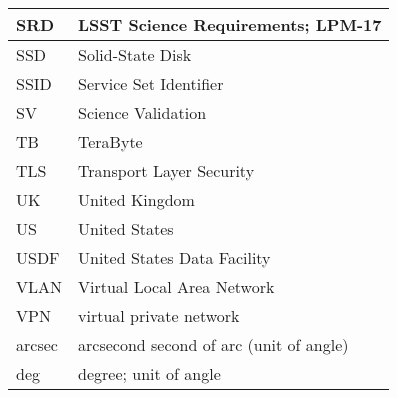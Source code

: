 \begin{longtable}{p{}p{}}
SRD & LSST Science Requirements; LPM-17 \\\hline
SSD & Solid-State Disk \\\hline
SSID & Service Set Identifier \\\hline
SV & Science Validation \\\hline
TB & TeraByte \\\hline
TLS & Transport Layer Security \\\hline
UK & United Kingdom \\\hline
US & United States \\\hline
USDF & United States Data Facility \\\hline
VLAN &  Virtual Local Area Network \\\hline
VPN & virtual private network \\\hline
arcsec & arcsecond second of arc (unit of angle) \\\hline
deg & degree; unit of angle \\\hline
\end{longtable}
